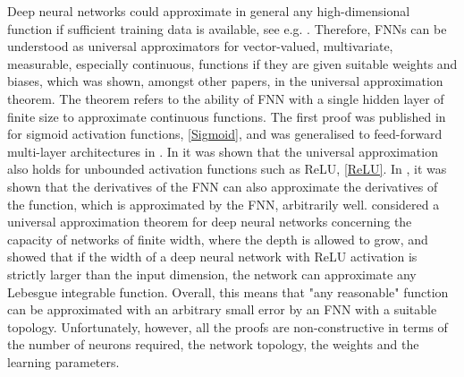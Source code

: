 Deep neural networks could approximate in general any high-dimensional function if sufficient training data is available, see e.g. \cite{ArzaniDawson:2021}. Therefore, FNNs can be understood as universal approximators for vector-valued, multivariate, measurable, especially continuous, functions if they are given suitable weights and biases, which was shown, amongst other papers, in the universal approximation theorem. The theorem refers to the ability of FNN with a single hidden layer of finite size to approximate continuous functions. The first proof was published in \cite{Cybenko:1989} for sigmoid activation functions, \cref{Sigmoid}, and was generalised to feed-forward multi-layer architectures in \cite{Hornik:1991}. In \cite{SonodaMurata:2017} it was shown that the universal approximation also holds for unbounded activation functions such as ReLU, \cref{ReLU}. In \cite{HornikStinchcombeWhite:1990}, it was shown that the derivatives of the FNN can also approximate the derivatives of the function, which is approximated by the FNN, arbitrarily well. \cite{LuPuWangHuWang:2017} considered a universal approximation theorem for deep neural networks concerning the capacity of networks of finite width, where the depth is allowed to grow, and showed that if the width of a deep neural network with ReLU activation is strictly larger than the input dimension, the network can approximate any Lebesgue integrable function. Overall, this means that "any reasonable" function can be approximated with an arbitrary small error by an FNN with a suitable topology. Unfortunately, however, all the proofs are non-constructive in terms of the number of neurons required, the network topology, the weights and the learning parameters. \\

